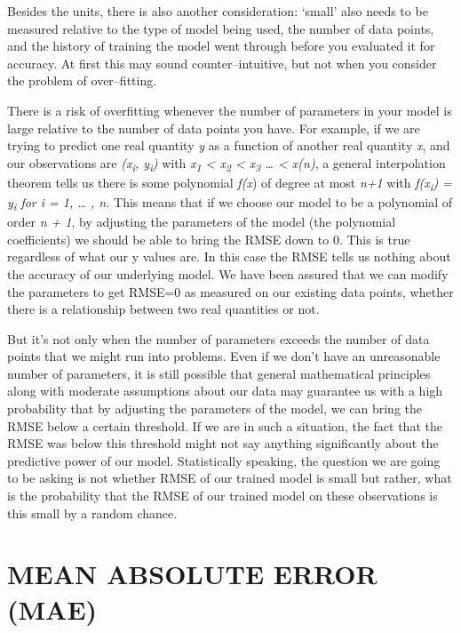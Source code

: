 \documentclass[12pt,a4paper]{report}
\numberwithin{equation}{section}
\begin{document}
Besides the units, there is also another consideration: `small' also
needs to be measured relative to the type of model being used, the
number of data points, and the history of training the model went
through before you evaluated it for accuracy. At first this may sound
counter--intuitive, but not when you consider the problem of
over--fitting.

There is a risk of overfitting whenever the number of parameters in your
model is large relative to the number of data points you have. For
example, if we are trying to predict one real quantity \emph{y} as a
function of another real quantity \emph{x}, and our observations are
\emph{(x\textsubscript{i}, y\textsubscript{i})} with \emph{x\textsubscript{1} \textless{} x\textsubscript{2} \textless{} x\textsubscript{3} \ldots{}
\textless{} x(n)}, a general interpolation theorem tells us there is
some polynomial \emph{f(x}) of degree at most \emph{n+1} with
\emph{f(x\textsubscript{i}) = y\textsubscript{i} for i = 1, \ldots{} , n.} This means that if we choose
our model to be a polynomial of order \emph{n + 1}, by adjusting the
parameters of the model (the polynomial coefficients) we should be able
to bring the RMSE down to 0. This is true regardless of what our y
values are. In this case the RMSE tells us nothing about the accuracy of
our underlying model. We have been assured that we can modify the
parameters to get RMSE=0 as measured on our existing data points,
whether there is a relationship between two real quantities or not.

But it's not only when the number of parameters exceeds the number of
data points that we might run into problems. Even if we don't have an
unreasonable number of parameters, it is still possible that general
mathematical principles along with moderate assumptions about our data
may guarantee us with a high probability that by adjusting the
parameters of the model, we can bring the RMSE below a certain
threshold. If we are in such a situation, the fact that the RMSE was
below this threshold might not say anything significantly about the
predictive power of our model. Statistically speaking, the question we
are going to be asking is not whether RMSE of our trained model is small
but rather, what is the probability that the RMSE of our trained model
on these observations is this small by a random chance.

\hypertarget{mean--absolute--error--mae}{%
\section{\texorpdfstring{\textbf{MEAN ABSOLUTE ERROR
(MAE)}}{MEAN ABSOLUTE ERROR (MAE)}}\label{mean--absolute--error--mae}}
\end{document}
